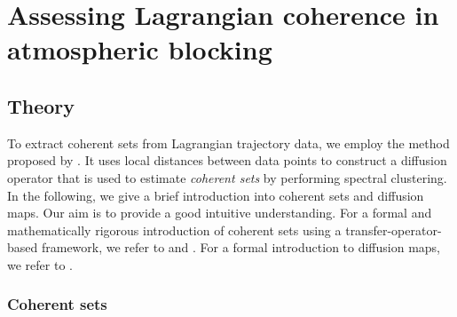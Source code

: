
\chapter[Lagrangian coherence]{Assessing Lagrangian coherence in atmospheric blocking} %
\label{ch:coherence}


\section{Theory} \label{sec:CS_the}

To extract coherent sets from Lagrangian trajectory data, we employ the method proposed by \textcite{banischUnderstandingGeometryTransport2017}.
It uses local distances between data points to construct a diffusion operator that is used to estimate \emph{coherent sets} by performing spectral clustering.
In the following, we give a brief introduction into coherent sets and diffusion maps.
Our aim is to provide a good intuitive understanding.
For a formal and mathematically rigorous introduction of coherent sets using a transfer-operator-based framework, we refer to \textcite{banischUnderstandingGeometryTransport2017} and \textcite{froylandAnalyticFrameworkIdentifying2013}. For a formal introduction to diffusion maps, we refer to \textcite{coifmanDiffusionMaps2006}.

\subsection{Coherent sets} \label{sec:CS_cs}

